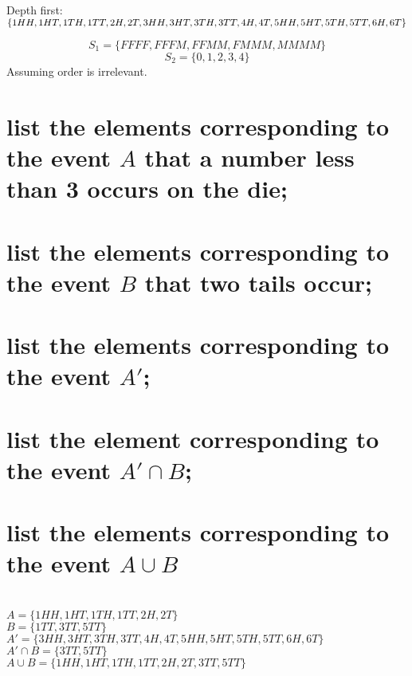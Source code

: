 \documentclass[answers]{exam}
\begin{document}
\begin{questions}
\begin{solution}
	Depth first: $\{1HH, 1HT, 1TH, 1TT, 2H, 2T, 3HH, 3HT, 3TH, 3TT, 4H, 4T, 5HH, 5HT, \\ 5TH, 5TT, 6H, 6T\}$
\end{solution}


\begin{solution}
	$$S_1 = \{FFFF, FFFM, FFMM, FMMM, MMMM\}$$
	$$S_2 = \{0, 1, 2, 3, 4\}$$
	Assuming order is irrelevant.
\end{solution}


\begin{parts}
	\part{list the elements corresponding to the event $A$ that a number less than 3 occurs on the die;}
	\part{list the elements corresponding to the event $B$ that two tails occur;}
	\part{list the elements corresponding to the event $A'$;}
	\part{list the element corresponding to the event $A' \cap B$;}
	\part{list the elements corresponding to the event $A \cup B$}
\end{parts}

\begin{solution}
	\\$A = \{1HH, 1HT, 1TH, 1TT, 2H, 2T\}$ \\
	$B = \{1TT, 3TT, 5TT\}$ \\
	$A' = \{3HH, 3HT, 3TH, 3TT, 4H, 4T, 5HH, 5HT, 5TH, 5TT, 6H, 6T\}$ \\
	$A' \cap B = \{3TT, 5TT\}$ \\
	$A \cup B = \{1HH, 1HT, 1TH, 1TT, 2H, 2T, 3TT, 5TT\}$
\end{solution}


\end{questions}
\end{document}
